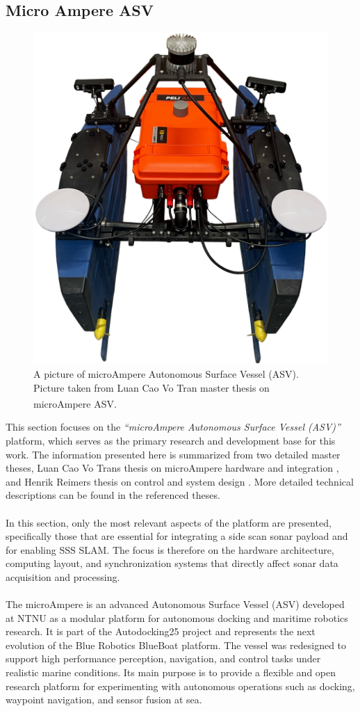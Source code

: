 \subsection{Micro Ampere ASV}
\begin{figure}[H]
    \centering
    \includegraphics[width=0.6\linewidth]{Pictures/Hardware/microAmpere_ASV/microAmpere_ASV.png}
    \caption{A picture of microAmpere Autonomous Surface Vessel (ASV). Picture taken from Luan Cao Vo Tran master thesis on microAmpere ASV.\textsuperscript{\cite{microAmpere_hardware_master_thesis1}}}
    \label{fig:microAmpere}
\end{figure}
\noindent
This section focuses on the \textit{``microAmpere Autonomous Surface Vessel (ASV)''} platform, which serves as the primary research and development base for this work. The information presented here is summarized from two detailed master theses, Luan Cao Vo Trans thesis on microAmpere hardware and integration \cite{microAmpere_hardware_master_thesis1}, and Henrik Reimers thesis on control and system design \cite{microAmpere_hardware_master_thesis2}. More detailed technical descriptions can be found in the referenced theses.
\\ \\
In this section, only the most relevant aspects of the platform are presented, specifically those that are essential for integrating a side scan sonar payload and for enabling SSS SLAM. The focus is therefore on the hardware architecture, computing layout, and synchronization systems that directly affect sonar data acquisition and processing.
\\ \\
The microAmpere is an advanced Autonomous Surface Vessel (ASV) developed at NTNU as a modular platform for autonomous docking and maritime robotics research. It is part of the Autodocking25 project and represents the next evolution of the Blue Robotics BlueBoat platform. The vessel was redesigned to support high performance perception, navigation, and control tasks under realistic marine conditions. Its main purpose is to provide a flexible and open research platform for experimenting with autonomous operations such as docking, waypoint navigation, and sensor fusion at sea.

